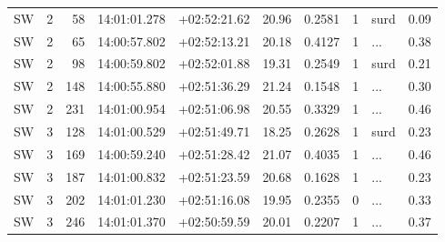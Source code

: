 \begin{tabular}{lrrllrrrlr}
  SW &       2 &     58 &  14:01:01.278 &  +02:52:21.62 &  20.96 &    0.2581 &  1 &       surd &        0.09 \\
  SW &       2 &     65 &  14:00:57.802 &  +02:52:13.21 &  20.18 &    0.4127 &  1 &        ... &        0.38 \\
  SW &       2 &     98 &  14:00:59.802 &  +02:52:01.88 &  19.31 &    0.2549 &  1 &       surd &        0.21 \\
  SW &       2 &    148 &  14:00:55.880 &  +02:51:36.29 &  21.24 &    0.1548 &  1 &        ... &        0.30 \\
  SW &       2 &    231 &  14:01:00.954 &  +02:51:06.98 &  20.55 &    0.3329 &  1 &        ... &        0.46 \\
  SW &       3 &    128 &  14:01:00.529 &  +02:51:49.71 &  18.25 &    0.2628 &  1 &       surd &        0.23 \\
  SW &       3 &    169 &  14:00:59.240 &  +02:51:28.42 &  21.07 &    0.4035 &  1 &        ... &        0.46 \\
  SW &       3 &    187 &  14:01:00.832 &  +02:51:23.59 &  20.68 &    0.1628 &  1 &        ... &        0.23 \\
  SW &       3 &    202 &  14:01:01.230 &  +02:51:16.08 &  19.95 &    0.2355 &  0 &        ... &        0.33 \\
  SW &       3 &    246 &  14:01:01.370 &  +02:50:59.59 &  20.01 &    0.2207 &  1 &        ... &        0.37 \\
\bottomrule
\end{tabular}
